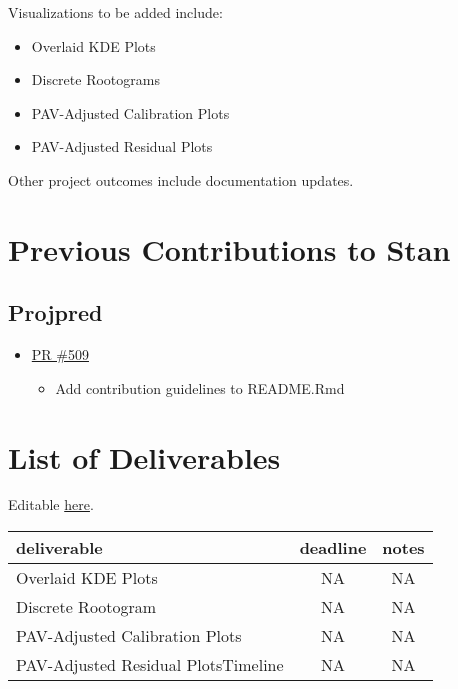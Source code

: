 \documentclass[
  letterpaper,
  DIV=11,
  numbers=noendperiod]{scrartcl}
\providecommand{\tightlist}{%
  \setlength{\itemsep}{0pt}\setlength{\parskip}{0pt}}\usepackage{longtable,booktabs,array}
\begin{document}
Visualizations to be added include:

\begin{itemize}
\item
  Overlaid KDE Plots
\item
  Discrete Rootograms
\item
  PAV-Adjusted Calibration Plots
\item
  PAV-Adjusted Residual Plots
\end{itemize}

Other project outcomes include documentation updates.

\section{Previous Contributions to
Stan}\label{previous-contributions-to-stan}

\subsection{Projpred}\label{projpred}

\begin{itemize}
\item
  \href{https://github.com/stan-dev/projpred/pull/509}{PR \#509}

  \begin{itemize}
  \tightlist
  \item
    Add contribution guidelines to README.Rmd
  \end{itemize}
\end{itemize}

\section{List of Deliverables}\label{list-of-deliverables}

Editable
\href{https://docs.google.com/spreadsheets/d/1llapJAsr9QqkNebSWEMnm0b4QB_sRLwOjwWQdF92Kak/edit?gid=1289123949\#gid=1289123949}{here}.

\begin{table}
\fontsize{12.0pt}{14.4pt}\selectfont
\begin{tabular*}{\linewidth}{@{\extracolsep{\fill}}lcc}
\toprule
deliverable & deadline & notes \\ 
\midrule\addlinespace[2.5pt]
Overlaid KDE Plots & NA & NA \\ 
Discrete Rootogram & NA & NA \\ 
PAV-Adjusted Calibration Plots & NA & NA \\ 
PAV-Adjusted Residual PlotsTimeline & NA & NA \\ 
\bottomrule
\end{tabular*}
\end{table}
\end{document}
